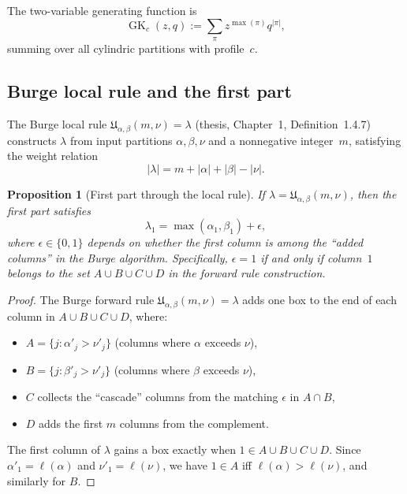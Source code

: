 \documentclass[11pt]{article}
\newtheorem{proposition}[theorem]{Proposition}
\newcommand{\GK}{\operatorname{GK}}
\begin{document}
The two-variable generating function is
\begin{equation}
  \GK_c(z,q) := \sum_\pi z^{\max(\pi)} q^{|\pi|},
  \label{eq:GK-def}
\end{equation}
summing over all cylindric partitions with profile~$c$.

\subsection{Burge local rule and the first part}

The Burge local rule $\mathfrak{U}_{\alpha,\beta}(m,\nu) = \lambda$ (thesis,
Chapter~1, Definition~1.4.7) constructs $\lambda$ from input partitions
$\alpha, \beta, \nu$ and a nonnegative integer~$m$, satisfying the weight relation
\begin{equation}
  |\lambda| = m + |\alpha| + |\beta| - |\nu|.
  \label{eq:weight-relation}
\end{equation}

\begin{proposition}[First part through the local rule]
\label{prop:first-part}
If $\lambda = \mathfrak{U}_{\alpha,\beta}(m,\nu)$, then the first part satisfies
\[
  \lambda_1 = \max(\alpha_1, \beta_1) + \epsilon,
\]
where $\epsilon \in \{0, 1\}$ depends on whether the first column is among the
``added columns'' in the Burge algorithm. Specifically, $\epsilon = 1$ if and
only if column~$1$ belongs to the set $A \cup B \cup C \cup D$ in the forward
rule construction.
\end{proposition}

\begin{proof}
The Burge forward rule $\mathfrak{U}_{\alpha,\beta}(m,\nu) = \lambda$ adds one
box to the end of each column in $A \cup B \cup C \cup D$, where:
\begin{itemize}
  \item $A = \{j : \alpha'_j > \nu'_j\}$ (columns where $\alpha$ exceeds $\nu$),
  \item $B = \{j : \beta'_j > \nu'_j\}$ (columns where $\beta$ exceeds $\nu$),
  \item $C$ collects the ``cascade'' columns from the matching $\epsilon$ in $A \cap B$,
  \item $D$ adds the first $m$ columns from the complement.
\end{itemize}
The first column of $\lambda$ gains a box exactly when $1 \in A \cup B \cup C \cup D$.
Since $\alpha'_1 = \ell(\alpha)$ and $\nu'_1 = \ell(\nu)$, we have $1 \in A$
iff $\ell(\alpha) > \ell(\nu)$, and similarly for $B$.
\end{proof}
\end{document}
